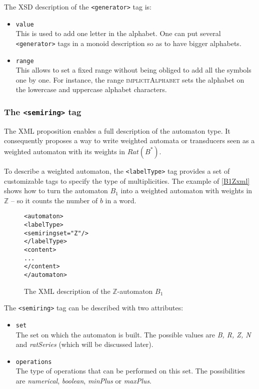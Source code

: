 \documentclass[a4paper]{article}
\newcommand{\xtag}[1]{\texttt{<#1>}}
\newcommand{\xattr}[1]{\texttt{#1}}
\begin{document}
The XSD description of the \xtag{generator} tag is:
\begin{itemize}
\item \xattr{value}\\
  This is used to add one letter in the alphabet. One can put several
  \xtag{generator} tags in a monoid description so as to have bigger
  alphabets.
\item \xattr{range}\\
  This allows to set a fixed range without being obliged to add all
  the symbols one by one. For instance, the range \textsc{implicitAlphabet}
  sets the alphabet on the lowercase and uppercase alphabet characters.
\end{itemize}

\subsubsection{The \xtag{semiring} tag}

The XML proposition enables a full description of the automaton type.
It consequently proposes a way to write weighted automata or
transducers seen as a weighted automaton with its weights in
$Rat(B^*)$.

To describe a weighted automaton, the \xtag{labelType} tag provides a set of
customizable tags to specify the type of multiplicities. The example
of \autoref{B1Zxml} shows how to turn the automaton $B_1$ into a
weighted automaton with weights in ${\mathbb Z}$ -- so it counts the
number of $b$ in a word.

\begin{figure}[ht]
  \small
  \begin{center}
\begin{alltt}
<automaton>
  \xtag{labelType}
     <semiring set="Z"/>
  </labelType>
  <content>
  ...
  </content>
</automaton>
\end{alltt}

\caption{The XML description of the $\mathbb{Z}$-automaton $B_1$}
\label{B1Zxml}
  \end{center}
\end{figure}

The \xtag{semiring} tag can be described with two attributes:
\begin{itemize}
\item \xattr{set}\\
  The set on which the automaton is built. The possible values are
\textit{B, R, Z, N} and \textit{ratSeries} (which will be discussed later).
\item \xattr{operations}\\
  The type of operations that can be performed on this set.  The
  possibilities are \textit{numerical}, \textit{boolean},
  \textit{minPlus} or \textit{maxPlus}.
\end{itemize}
\end{document}
